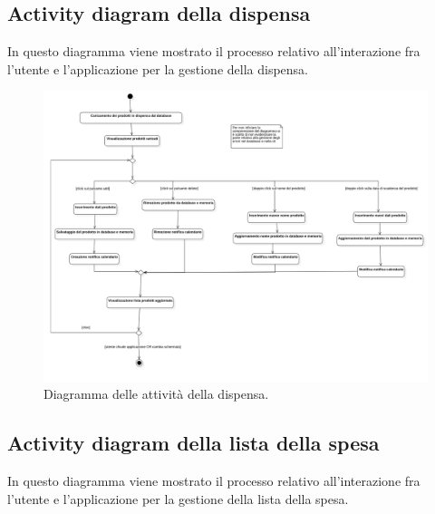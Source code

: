 \subsection{Activity diagram della dispensa}

In questo diagramma viene mostrato il processo relativo all'interazione fra l'utente e l'applicazione per la gestione della dispensa. 

\begin{figure}[H]
    \includegraphics[width=\linewidth]{images/activity-pantry.png}
    \caption{Diagramma delle attività della dispensa.}
    \label{fig:actpantry}
\end{figure}

\newpage

\subsection{Activity diagram della lista della spesa}

In questo diagramma viene mostrato il processo relativo all'interazione fra l'utente e l'applicazione per la gestione della lista della spesa.

